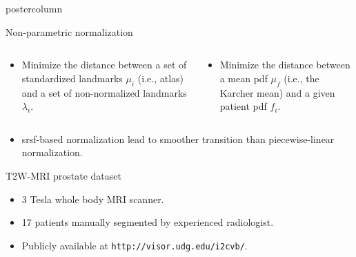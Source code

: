 \documentclass[final, size=a0]{beamer}
\begin{document}
\begin{frame}
\begin{columns}
\begin{column}{.33\textwidth}
\begin{beamercolorbox}[center,wd=\textwidth]{postercolumn}
\begin{minipage}[T]{.95\textwidth}
{\begin{alertblock}{Non-parametric normalization}
              \begin{columns}
                \begin{column}{.5\textwidth}
                  \begin{itemize}
                  \justifying
                  \item Minimize the distance between a set of standardized landmarks $\mu_i$ (i.e., atlas) and a set of non-normalized landmarks $\lambda_i$.
                  \end{itemize}
                \end{column}
                \begin{column}{.5\textwidth}
                  \begin{itemize}
                    \justifying
                  \item Minimize the distance between a mean \acs{pdf} $\mu_f$ (i.e., the Karcher mean) and a given patient \ac{pdf} $f_i$.
                  \end{itemize}
                \end{column}
              \end{columns}

              \vspace{1cm}

              \begin{itemize}
                \justifying
              \item \acs{srsf}-based normalization lead to smoother transition than piecewise-linear normalization.
              \end{itemize}

            \end{alertblock}

            \vspace{.2cm}

            \begin{block}{T2W-MRI prostate dataset}
              \begin{itemize}
                \justifying
              \item 3 Tesla whole body MRI scanner.
              \item 17 patients manually segmented by experienced radiologist.
              \item Publicly available at \texttt{http://visor.udg.edu/i2cvb/}.
              \end{itemize}


\end{block}}
\end{minipage}
\end{beamercolorbox}
\end{column}
\end{columns}
\end{frame}
\end{document}
